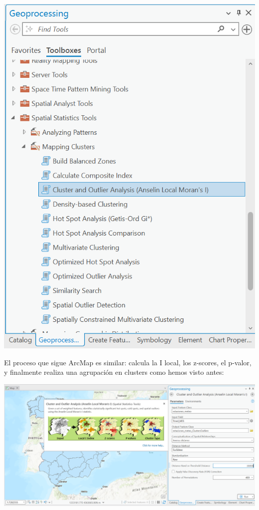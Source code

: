 \documentclass[
  letterpaper,
  DIV=11,
  numbers=noendperiod]{scrreprt}
\begin{document}
\includegraphics{images/Anselin_01_ArcGIS.png}

El proceso que sigue ArcMap es similar: calcula la I local, los
z-scores, el p-valor, y finalmente realiza una agrupación en clusters
como hemos visto antes:

\includegraphics{images/Anselin_02_ArcGIS.png}
\end{document}
